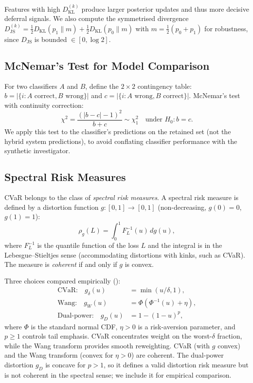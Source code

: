 Features with high $D_{\text{KL}}^{(k)}$ produce larger posterior updates and thus more decisive deferral signals. We also compute the symmetrised divergence $D_{\text{JS}}^{(k)} = \frac{1}{2}D_{\text{KL}}(p_1 \| m) + \frac{1}{2}D_{\text{KL}}(p_0 \| m)$ with $m = \frac{1}{2}(p_0 + p_1)$ for robustness, since $D_{\text{JS}}$ is bounded $\in [0, \log 2]$.

\subsection{McNemar's Test for Model Comparison}

For two classifiers $A$ and $B$, define the $2 \times 2$ contingency table: $b = |\{i : A \text{ correct}, B \text{ wrong}\}|$ and $c = |\{i : A \text{ wrong}, B \text{ correct}\}|$. McNemar's test with continuity correction:
\begin{equation}
\chi^2 = \frac{(|b - c| - 1)^2}{b + c} \sim \chi^2_1 \quad \text{under } H_0: b = c.
\end{equation}
We apply this test to the classifier's predictions on the retained set (not the hybrid system predictions), to avoid conflating classifier performance with the synthetic investigator.

\subsection{Spectral Risk Measures}

CVaR belongs to the class of \textit{spectral risk measures}. A spectral risk measure is defined by a distortion function $g : [0,1] \to [0,1]$ (non-decreasing, $g(0) = 0$, $g(1) = 1$):
\begin{equation}
\rho_g(L) = \int_0^1 F_L^{-1}(u) \, dg(u),
\end{equation}
where $F_L^{-1}$ is the quantile function of the loss $L$ and the integral is in the Lebesgue--Stieltjes sense (accommodating distortions with kinks, such as CVaR). The measure is \textit{coherent} if and only if $g$ is convex.

Three choices compared empirically ():
\begin{align}
\text{CVaR:} \quad g_{\delta}(u) &= \min(u/\delta, 1), \\
\text{Wang:} \quad g_W(u) &= \Phi(\Phi^{-1}(u) + \eta), \\
\text{Dual-power:} \quad g_D(u) &= 1 - (1-u)^p,
\end{align}
where $\Phi$ is the standard normal CDF, $\eta > 0$ is a risk-aversion parameter, and $p \geq 1$ controls tail emphasis. CVaR concentrates weight on the worst-$\delta$ fraction, while the Wang transform provides smooth reweighting. CVaR (with $g$ convex) and the Wang transform (convex for $\eta > 0$) are coherent. The dual-power distortion $g_D$ is concave for $p > 1$, so it defines a valid distortion risk measure but is not coherent in the spectral sense; we include it for empirical comparison.

